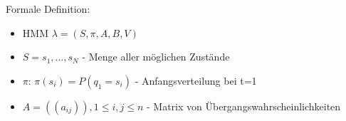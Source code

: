 \documentclass[a4paper,10pt,oneside]{article}
\begin{document}
Formale Definition:
	\begin{itemize}
		\item HMM $\lambda = (S,\pi, A,B,V)$
		\item $S={s_1,...,s_N}$ - Menge aller möglichen Zustände
		\item $\pi$: $\pi(s_i) = P(q_1 = s_i)$ - Anfangsverteilung bei t=1
		\item $A=((a_{ij})), 1 \leq i, j \leq n$ - Matrix von Übergangswahrscheinlichkeiten
	\end{itemize}
 		
 		
 		
 		
 		
 		
 		
 		
 		
 		
 		
 		
 		
 		
 		
 		
 		
 		
 		
 		
 		
 		
 		
 		
 		
 		
 		
 		
 		
 		
 		
 		
 		
 		
 		
 		
 	

 
\end{document}
